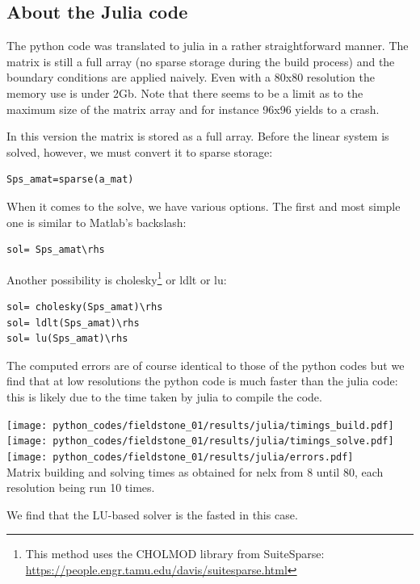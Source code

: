 \newpage
\subsection*{About the Julia code}

The python code was translated to julia in a rather straightforward manner. 
The matrix is still a full array (no sparse storage during the build process) 
and the boundary conditions
are applied naively. Even with a 80x80 resolution the memory use is under 2Gb. 
Note that there seems to be a limit as to the maximum size of the matrix array 
and for instance 96x96 yields to a crash.

In this version the matrix is stored as a full array. 
Before the linear system is solved, however, we must convert it to sparse storage:
\begin{verbatim}
Sps_amat=sparse(a_mat)
\end{verbatim}
When it comes to the solve, we have various options. The first and most 
simple one is similar to Matlab's backslash:
\begin{verbatim}
sol= Sps_amat\rhs
\end{verbatim}
Another possibility is cholesky\footnote{This method uses the CHOLMOD library from SuiteSparse:
\url{https://people.engr.tamu.edu/davis/suitesparse.html}} or ldlt or lu:
\begin{verbatim}
sol= cholesky(Sps_amat)\rhs
sol= ldlt(Sps_amat)\rhs
sol= lu(Sps_amat)\rhs
\end{verbatim}


The computed errors are of course identical to those of the python codes but we find that
at low resolutions the python code is much faster than the julia code: 
this is likely due to the time taken by julia to compile the code.
 

\begin{center}
\texttt{[image: python\_codes/fieldstone\_01/results/julia/timings\_build.pdf]}
\texttt{[image: python\_codes/fieldstone\_01/results/julia/timings\_solve.pdf]}
\texttt{[image: python\_codes/fieldstone\_01/results/julia/errors.pdf]}\\
{\captionfont Matrix building and solving times as obtained for nelx from 8 until 80, each 
resolution being run 10 times.}
\end{center}

We find that the LU-based solver is the fasted in this case.





